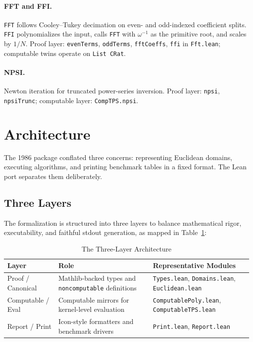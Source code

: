 \documentclass[11pt,a4paper]{article}
\begin{document}
\paragraph{FFT and FFI.} \texttt{FFT} follows Cooley–Tukey decimation on even- and odd-indexed coefficient splits. \texttt{FFI} polynomializes the input, calls \texttt{FFT} with $\omega^{-1}$ as the primitive root, and scales by $1/N$. Proof layer: \texttt{evenTerms}, \texttt{oddTerms}, \texttt{fftCoeffs}, \texttt{ffi} in \texttt{Fft.lean}; computable twins operate on \texttt{List CRat}.

\paragraph{NPSI.} Newton iteration for truncated power-series inversion. Proof layer: \texttt{npsi}, \texttt{npsiTrunc}; computable layer: \texttt{CompTPS.npsi}.

\section{Architecture}
The 1986 package conflated three concerns: representing Euclidean domains, executing algorithms, and printing benchmark tables in a fixed format. The Lean port separates them deliberately.

\subsection{Three Layers}
The formalization is structured into three layers to balance mathematical rigor, executability, and faithful stdout generation, as mapped in Table~\ref{tab:layers}:

\begin{table}[htbp]
\centering
\caption{The Three-Layer Architecture}
\label{tab:layers}
\small
\begin{tabularx}{\textwidth}{@{}l>{\raggedright\arraybackslash}X>{\raggedright\arraybackslash}X@{}}
\toprule
\textbf{Layer} & \textbf{Role} & \textbf{Representative Modules} \\
\midrule
Proof / Canonical & Mathlib-backed types and \texttt{noncomputable} definitions & \texttt{Types.lean}, \texttt{Domains.lean}, \texttt{Euclidean.lean} \\
Computable / Eval & Computable mirrors for kernel-level evaluation & \texttt{ComputablePoly.lean}, \texttt{ComputableTPS.lean} \\
Report / Print & Icon-style formatters and benchmark drivers & \texttt{Print.lean}, \texttt{Report.lean} \\
\bottomrule
\end{tabularx}
\end{table}
\end{document}

